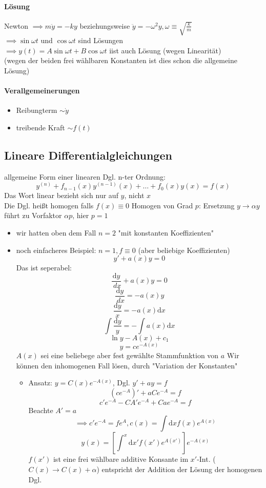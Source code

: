 \documentclass[a4paper]{scrartcl}
\renewcommand{\d}{\mathrm{d}}
\newcommand{\dd}[2]{\frac{\d #1}{\ d#2}}
\theoremstyle{definition}
\theoremstyle{plain}
\theoremstyle{remark}
\theoremstyle{remark}
\begin{document}
\paragraph{Lösung}
\label{sec-3-5-1-2}
Newton $\implies m\ddot{y} = -ky$ beziehungsweise $\ddot{y} = -\omega^2 y,\omega\equiv\sqrt{\frac{k}{m}}$ \\
     $\implies \sin{\omega t}$ und $\cos{\omega t}$ sind Lösungen \\
     $\implies y(t) = A\sin{\omega t} + B\cos{\omega t}$ iist auch Lösung (wegen Linearität) \\
     (wegen der beiden frei wählbaren Konstanten ist dies schon die allgemeine Lösung)
\paragraph{Verallgemeinerungen}
\label{sec-3-5-1-3}
\begin{itemize}
\item Reibungterm $\sim \dot{y}$
\item treibende Kraft $\sim f(t)$
\end{itemize}
\subsection{Lineare Differentialgleichungen}
\label{sec-3-6}
allgemeine Form einer linearen Dgl. n-ter Ordnung:
\[y^{(n)} + f_{n -1}(x)y^{(n - 1)}(x) + \ldots + f_0(x)y(x) = f(x)\]
Das Wort linear bezieht sich nur auf $y$, nicht $x$ \\
   Die Dgl. heißt homogen falls $f(x)\equiv 0$
Homogen von Grad $p$: Ersetzung $y\to\alpha y$ führt zu Vorfaktor $\alpha p$, hier $p = 1$
\begin{itemize}
\item wir hatten oben dem Fall $n = 2$ "mit konstanten Koeffizienten"
\item noch einfacheres Beispiel: $n = 1, f\equiv 0$ (aber beliebige Koeffizienten)
\[y' + a(x)y = 0\]
Das ist seperabel:
\[\dd{y}{x} + a(x) y = 0\]
\[\dd{y}{x} = -a(x) y\]
\[\frac{\d y}{x} = -a(x) \d x\]
\[\int\frac{\d y}{y} = - \int a(x)\d x\]
\[\ln{y} - A(x) + c_1\]
\[y = c e^{-A(x)}\]
$A(x)$ sei eine beliebege aber fest gewählte Stammfunktion von $a$
Wir können den inhomogenen Fall lösen, durch "Variation der Konstanten"
\begin{itemize}
\item Ansatz: $y = C(x)e^{-A(x)}$, Dgl. $y' + ay = f$
       \[(c e^{-A})' + a C e^{-A} = f\]
       \[c' e^{-A} - C A' e^{-A} + C a e^{-A} = f\]
       Beachte $A' = a$
       \[\implies c'e^{-A} = f e^{A},c(x) = \int\d x f(x) e^{A(x)}\]
       \[y(x) = \left[\int^x\d x' f(x') e^{A(x')}\right] e^{-A(x)}\]
       $f(x')$ ist eine frei wählbare additive Konsante im $x'$-Int. ($C(x)\to C(x) +\alpha$) entspricht der Addition der Lösung der homogenen Dgl.
\end{itemize}
\end{itemize}
\end{document}
